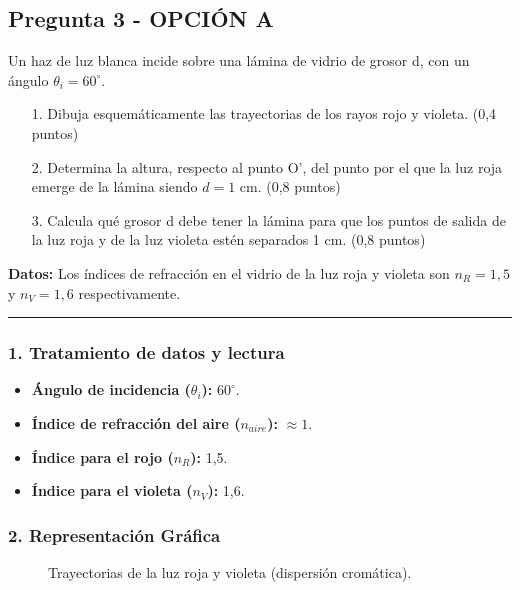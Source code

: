\subsection{Pregunta 3 - OPCIÓN A}
\label{subsec:3A_2004_jun_ord}

\begin{cajaenunciado}
Un haz de luz blanca incide sobre una lámina de vidrio de grosor d, con un ángulo $\theta_i=60^\circ$.
\begin{enumerate}
    \item[1.] Dibuja esquemáticamente las trayectorias de los rayos rojo y violeta. (0,4 puntos)
    \item[2.] Determina la altura, respecto al punto O', del punto por el que la luz roja emerge de la lámina siendo $d=1$ cm. (0,8 puntos)
    \item[3.] Calcula qué grosor d debe tener la lámina para que los puntos de salida de la luz roja y de la luz violeta estén separados 1 cm. (0,8 puntos)
\end{enumerate}
\textbf{Datos:} Los índices de refracción en el vidrio de la luz roja y violeta son $n_R=1,5$ y $n_V=1,6$ respectivamente.
\end{cajaenunciado}
\hrule

\subsubsection*{1. Tratamiento de datos y lectura}
\begin{itemize}
    \item \textbf{Ángulo de incidencia ($\theta_i$):} $60^\circ$.
    \item \textbf{Índice de refracción del aire ($n_{aire}$):} $\approx 1$.
    \item \textbf{Índice para el rojo ($n_R$):} 1,5.
    \item \textbf{Índice para el violeta ($n_V$):} 1,6.
\end{itemize}

\subsubsection*{2. Representación Gráfica}
\begin{figure}[H]
    \centering
    \caption{Trayectorias de la luz roja y violeta (dispersión cromática).}
\end{figure}

